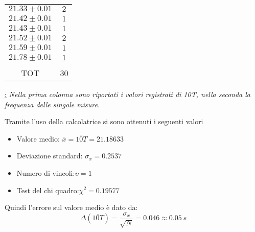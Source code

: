 \documentclass[12pt, a4paper]{article}
\begin{document}
\begin{table}[!htb]
\begin{minipage}[t]{.3\linewidth}
\begin{tabular}{|c|c|}
            
            $21.33\pm 0.01$ & $2$\\
            $21.42\pm 0.01$ & $1$\\
            $21.43\pm 0.01$ & $1$\\
            $21.52\pm 0.01$ & $2$\\
            $21.59\pm 0.01$ & $1$\\
            $21.78\pm 0.01$ & $1$\\
            &\\
            \hline
            \hline
            TOT & 30\\
            \hline
        \end{tabular}
        \label{TAB:1}
    \end{minipage} 
\end{table}
\begin{center}
   \href{Tabella 1} : \textit{\footnotesize{Nella prima colonna sono riportati i valori registrati di 10T, nella seconda la frequenza delle singole misure.}}
\end{center}


\addvspace{3cm}

Tramite l'uso della calcolatrice si sono ottenuti i seguenti valori\begin{itemize}

\bigskip

    \item\phantom{asd} Valore medio:\phantom{aaaaaaaaa.aaaaa}
          $\overline{x}=\overline{10T}=21.18633$
\\
      
    \item\phantom{asd} Deviazione standard:\phantom{aaaaaaaa}
        $\sigma_x=0.2537$
\\

     \item\phantom{asd} Numero di vincoli:\phantom{aaaaaaaaaaa}$\upsilon=1$
\\

 \item\phantom{asd} Test del chi quadro:\phantom{aaaaaaaaaa}$\chi^2=0.19577$
    
\end{itemize}
\bigskip

Quindi l'errore sul valore medio è dato da:
\begin{equation*}
    \Delta (\overline{10T})=\frac{\sigma_x}{\sqrt{N}}=0.046\approx 0.05\ s
\end{equation*}
\end{document}
